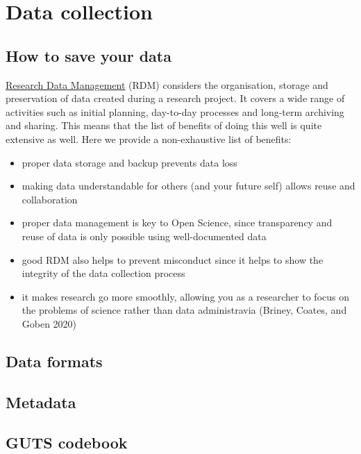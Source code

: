 \documentclass[
  letterpaper,
  DIV=11,
  numbers=noendperiod]{scrreprt}
\begin{document}
\part{Data collection}

\hypertarget{how-to-save-your-data}{%
\chapter{How to save your data}\label{how-to-save-your-data}}

\href{https://the-turing-way.netlify.app/afterword/glossary.html\#term-Research-Data-Management}{Research
Data Management} (RDM) considers the organisation, storage and
preservation of data created during a research project. It covers a wide
range of activities such as initial planning, day-to-day processes and
long-term archiving and sharing. This means that the list of benefits of
doing this well is quite extensive as well. Here we provide a
non-exhaustive list of benefits:

\begin{itemize}
\item
  proper data storage and backup prevents data loss
\item
  making data understandable for others (and your future self) allows
  reuse and collaboration
\item
  proper data management is key to Open Science, since transparency and
  reuse of data is only possible using well-documented data
\item
  good RDM also helps to prevent misconduct since it helps to show the
  integrity of the data collection process
\item
  it makes research go more smoothly, allowing you as a researcher to
  focus on the problems of science rather than data administravia
  (Briney, Coates, and Goben 2020)
\end{itemize}

\hypertarget{data-formats}{%
\chapter{Data formats}\label{data-formats}}

\hypertarget{metadata}{%
\chapter{Metadata}\label{metadata}}

\hypertarget{guts-codebook}{%
\chapter{GUTS codebook}\label{guts-codebook}}
\end{document}
